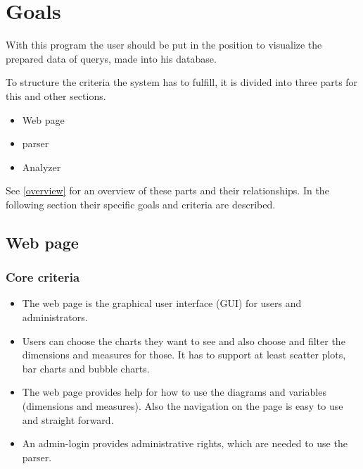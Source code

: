 \section{Goals}

 
With this program the user should be put in the position 
to visualize the prepared data of \glspl{query}, made into his \gls{database}.


To structure the criteria the system has to fulfill, 
it is divided into three parts for this and other sections.
\begin{itemize}
  \item Web page
  \item \gls{parser}
  \item Analyzer
\end{itemize}
See \ref{overview} for an overview of these parts and their relationships.
In the following section their specific goals and criteria are described.
 

% 


\subsection{Web page}
\subsubsection{Core criteria}
\begin{itemize}
\item The web page is the graphical user interface (\gls{GUI}) for users and administrators. 

\item Users can choose the \glspl{chart} they want to see 
and also choose and filter the \glspl{dimension} and \glspl{measure} for those. 
It has to support at least \glspl{scatter plot}, \glspl{bar chart} and \glspl{bubble chart}.

\item The web page provides help for how to use the \glspl{diagram} and variables (\glspl{dimension} 
and measures). 
Also the navigation on the page is easy to use and straight forward.

\item An admin-login provides administrative rights, which are needed to use the \gls{parser}.
\end{itemize}


